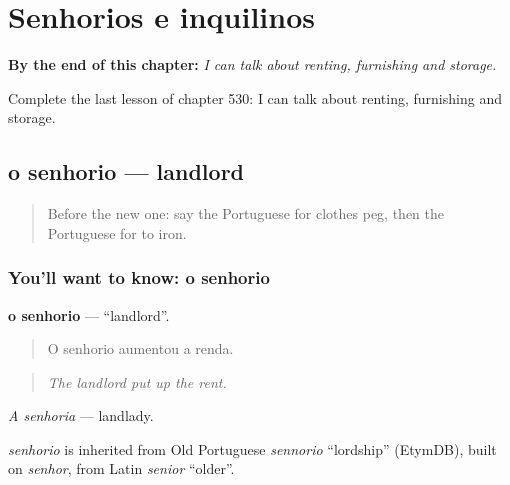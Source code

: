 
\chapter{Senhorios e inquilinos}
\label{ch:pt-senhorios-e-inquilinos}

\begin{chapteropening}
\textbf{By the end of this chapter:} \emph{I can talk about renting, furnishing and storage.}

Complete the last lesson of chapter 530: I can talk about renting, furnishing and storage.
\end{chapteropening}

\section[o senhorio]{o senhorio — landlord}

\label{lesson:PT-C530-senhorio}



\begin{quote}
Before the new one: say the Portuguese for clothes peg, then the Portuguese for to iron.
\end{quote}

\subsection*{You'll want to know: o senhorio}
\textbf{o senhorio} — \textquotedblleft{}landlord\textquotedblright{}.

\begin{quote}
O senhorio aumentou a renda.
\end{quote}

\begin{quote}
\emph{The landlord put up the rent.}
\end{quote}

\emph{A senhoria} — landlady.

\begin{cousinweb}
\emph{senhorio} is inherited from Old Portuguese \emph{sennorio} \textquotedblleft{}lordship\textquotedblright{} (EtymDB), built on \emph{senhor}, from Latin \emph{senior} \textquotedblleft{}older\textquotedblright{}.
\end{cousinweb}

